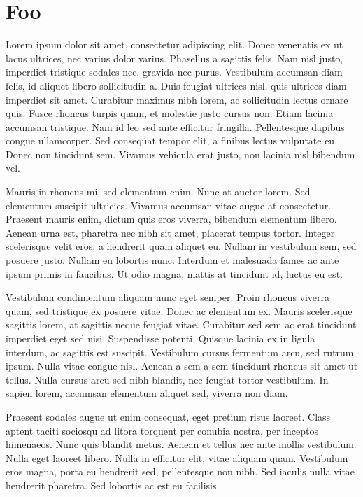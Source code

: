 \chapter{Foo}

Lorem ipsum dolor sit amet, consectetur adipiscing elit. Donec venenatis ex ut lacus ultrices, nec varius dolor varius. Phasellus a sagittis felis. Nam nisl justo, imperdiet tristique sodales nec, gravida nec purus. Vestibulum accumsan diam felis, id aliquet libero sollicitudin a. Duis feugiat ultrices nisl, quis ultrices diam imperdiet sit amet. Curabitur maximus nibh lorem, ac sollicitudin lectus ornare quis. Fusce rhoncus turpis quam, et molestie justo cursus non. Etiam lacinia accumsan tristique. Nam id leo sed ante efficitur fringilla. Pellentesque dapibus congue ullamcorper. Sed consequat tempor elit, a finibus lectus vulputate eu. Donec non tincidunt sem. Vivamus vehicula erat justo, non lacinia nisl bibendum vel.

Mauris in rhoncus mi, sed elementum enim. Nunc at auctor lorem. Sed elementum suscipit ultricies. Vivamus accumsan vitae augue at consectetur. Praesent mauris enim, dictum quis eros viverra, bibendum elementum libero. Aenean urna est, pharetra nec nibh sit amet, placerat tempus tortor. Integer scelerisque velit eros, a hendrerit quam aliquet eu. Nullam in vestibulum sem, sed posuere justo. Nullam eu lobortis nunc. Interdum et malesuada fames ac ante ipsum primis in faucibus. Ut odio magna, mattis at tincidunt id, luctus eu est.

Vestibulum condimentum aliquam nunc eget semper. Proin rhoncus viverra quam, sed tristique ex posuere vitae. Donec ac elementum ex. Mauris scelerisque sagittis lorem, at sagittis neque feugiat vitae. Curabitur sed sem ac erat tincidunt imperdiet eget sed nisi. Suspendisse potenti. Quisque lacinia ex in ligula interdum, ac sagittis est suscipit. Vestibulum cursus fermentum arcu, sed rutrum ipsum. Nulla vitae congue nisl. Aenean a sem a sem tincidunt rhoncus sit amet ut tellus. Nulla cursus arcu sed nibh blandit, nec feugiat tortor vestibulum. In sapien lorem, accumsan elementum aliquet sed, viverra non diam.

Praesent sodales augue ut enim consequat, eget pretium risus laoreet. Class aptent taciti sociosqu ad litora torquent per conubia nostra, per inceptos himenaeos. Nunc quis blandit metus. Aenean et tellus nec ante mollis vestibulum. Nulla eget laoreet libero. Nulla in efficitur elit, vitae aliquam quam. Vestibulum eros magna, porta eu hendrerit sed, pellentesque non nibh. Sed iaculis nulla vitae hendrerit pharetra. Sed lobortis ac est eu facilisis.

